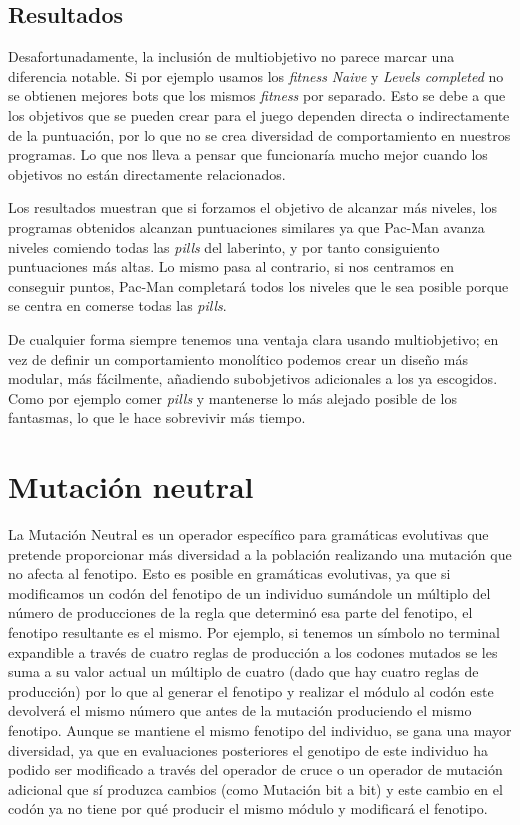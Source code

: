 \subsection{Resultados}
Desafortunadamente, la inclusión de multiobjetivo no parece marcar una diferencia notable. Si por ejemplo usamos los \textit{fitness} \textit{Naive} y \textit{Levels completed} no se obtienen mejores bots que los mismos \textit{fitness} por separado. Esto se debe a que los objetivos que se pueden crear para el juego dependen directa o indirectamente de la puntuación, por lo que no se crea diversidad de comportamiento en nuestros programas. Lo que nos lleva a pensar que funcionaría mucho mejor cuando los objetivos no están directamente relacionados.
 
Los resultados muestran que si forzamos el objetivo de alcanzar más niveles, los programas obtenidos alcanzan puntuaciones similares ya que Pac-Man avanza niveles comiendo todas las \textit{pills} del laberinto, y por tanto consiguiento puntuaciones más altas. Lo mismo pasa al contrario, si nos centramos en conseguir puntos, Pac-Man completará todos los niveles que le sea posible porque se centra en comerse todas las \textit{pills}.
 
De cualquier forma siempre tenemos una ventaja clara usando multiobjetivo; en vez de definir un comportamiento monolítico podemos crear un diseño más modular, más fácilmente, añadiendo subobjetivos adicionales a los ya escogidos. Como por ejemplo comer \textit{pills} y mantenerse lo más alejado posible de los fantasmas, lo que le hace sobrevivir más tiempo.

\section{Mutación neutral}
La Mutación Neutral es un operador específico para gramáticas evolutivas \cite{oesch2015neutral} que pretende proporcionar más diversidad a la población realizando una mutación que no afecta al fenotipo. Esto es posible en gramáticas evolutivas, ya que si modificamos un codón del fenotipo de un individuo sumándole un múltiplo del número de producciones de la regla que determinó esa parte del fenotipo, el fenotipo resultante es el mismo. Por ejemplo, si tenemos un símbolo no terminal expandible a través de cuatro reglas de producción a los codones mutados se les suma a su valor actual un múltiplo de cuatro (dado que hay cuatro reglas de producción) por lo que al generar el fenotipo y realizar el módulo al codón este devolverá el mismo número que antes de la mutación produciendo el mismo fenotipo.
Aunque se mantiene el mismo fenotipo del individuo, se gana una mayor diversidad, ya que en evaluaciones posteriores el genotipo de este individuo ha podido ser modificado a través del operador de cruce o un operador de mutación adicional que sí produzca cambios (como Mutación bit a bit) y este cambio en el codón ya no tiene por qué producir el mismo módulo y modificará el fenotipo.


